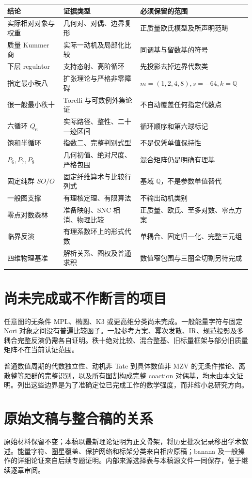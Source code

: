 \documentclass[11pt,a4paper,oneside]{ctexrep}
\theoremstyle{cnplain}
\theoremstyle{definition}
\theoremstyle{remark}
\newcommand{\Q}{\mathbb Q}
\begin{document}
\begin{longtable}{p{}p{}p{}}
\toprule
结论 & 证据类型 & 必须保留的范围\\\midrule\endhead
实际相对对象与权重 & 几何对、对偶、边界复形 & 正质量欧氏模型及所声明范畴\\
质量 Kummer 商 & 实际一动机及局部化比较 & 同调基与留数基的符号\\
下层 regulator & 支持态射、高阶循环 & 先投影去掉边界代数类\\
指定最小秩八 & 扩张理论与严格非零障碍 & $m=(1,2,4,8),s=-64,k=\Q$\\
很一般最小秩十 & Torelli 与可数例外集论证 & 不自动覆盖任何指定代数点\\
六循环 $Q_6$ & 实际路径、整性、二十一迹区间 & 循环顺序和第六球标记\\
饱和半循环 & 指数二、完整判别式型 & 不是仅凭单值保持性\\
$P_6,P_7,P_8$ & 几何初值、绝对尺度、严格包围 & 混合矩阵仍是明确有理基\\
固定纯群 $SO/O$ & 固定纤维算术与比较行列式 & 基域 $\Q$，不是参数单值替代\\
一般图支撑 & 有理核定理、有限算法 & 不输出动机类别\\
零点对数森林 & 准备映射、SNC 相消、物理比较 & 正质量、欧氏、至多对数、零点方案\\
临界反演 & 有理系数环上的形式代数 & 单耦合、固定归一化、完整三元组\\
四维物理基准 & 解析关系、图权及普通求积 & 数值窄包围与三圈全切割另待完成\\
\bottomrule
\end{longtable}

\section{尚未完成或不作断言的项目}
任意图的无条件 MPL、椭圆、K3 或更高维分类尚未完成。一般能量字符与固定 Nori 对象之间没有普遍比较函子。一般参考方案、幂次发散、IR、规范投影及多耦合完整反演仍需各自证明。秩十绝对比较、混合整基、旧标量框架与部分旧质量矩阵不在当前认证范围。

普通数值周期的代数独立性、动机非 Tate 到具体数值非 MZV 的无条件推论、离散整等距群的完整识别，以及所有图割构成完整 coaction 对偶基，均未由本文证明。列出这些边界是为了准确定位已完成工作的数学强度，而非缩小总研究方向。

\section{原始文稿与整合稿的关系}
原始材料保留不变；本稿以最新理论证明为正文骨架，将历史批次记录移出学术叙述。能量字符、圈星覆盖、保护网络和标架分类来自相应原稿；banana 及一般操作的详细论证来自后续专题证明。内部来源选择表与本稿源文件一同保存，便于继续逐章审阅。
\end{document}
